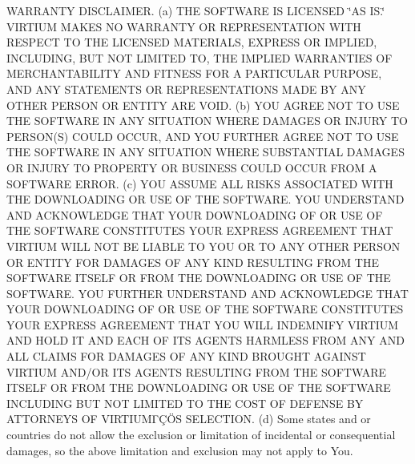 \begin{DoxyEnumerate}
\item W\+A\+R\+R\+A\+N\+TY D\+I\+S\+C\+L\+A\+I\+M\+ER. (a) T\+HE S\+O\+F\+T\+W\+A\+RE IS L\+I\+C\+E\+N\+S\+ED \char`\"{}\+A\+S I\+S.\char`\"{} V\+I\+R\+T\+I\+UM M\+A\+K\+ES NO W\+A\+R\+R\+A\+N\+TY OR R\+E\+P\+R\+E\+S\+E\+N\+T\+A\+T\+I\+ON W\+I\+TH R\+E\+S\+P\+E\+CT TO T\+HE L\+I\+C\+E\+N\+S\+ED M\+A\+T\+E\+R\+I\+A\+LS, E\+X\+P\+R\+E\+SS OR I\+M\+P\+L\+I\+ED, I\+N\+C\+L\+U\+D\+I\+NG, B\+UT N\+OT L\+I\+M\+I\+T\+ED TO, T\+HE I\+M\+P\+L\+I\+ED W\+A\+R\+R\+A\+N\+T\+I\+ES OF M\+E\+R\+C\+H\+A\+N\+T\+A\+B\+I\+L\+I\+TY A\+ND F\+I\+T\+N\+E\+SS F\+OR A P\+A\+R\+T\+I\+C\+U\+L\+AR P\+U\+R\+P\+O\+SE, A\+ND A\+NY S\+T\+A\+T\+E\+M\+E\+N\+TS OR R\+E\+P\+R\+E\+S\+E\+N\+T\+A\+T\+I\+O\+NS M\+A\+DE BY A\+NY O\+T\+H\+ER P\+E\+R\+S\+ON OR E\+N\+T\+I\+TY A\+RE V\+O\+ID. (b) Y\+OU A\+G\+R\+EE N\+OT TO U\+SE T\+HE S\+O\+F\+T\+W\+A\+RE IN A\+NY S\+I\+T\+U\+A\+T\+I\+ON W\+H\+E\+RE D\+A\+M\+A\+G\+ES OR I\+N\+J\+U\+RY TO P\+E\+R\+S\+O\+N(\+S) C\+O\+U\+LD O\+C\+C\+UR, A\+ND Y\+OU F\+U\+R\+T\+H\+ER A\+G\+R\+EE N\+OT TO U\+SE T\+HE S\+O\+F\+T\+W\+A\+RE IN A\+NY S\+I\+T\+U\+A\+T\+I\+ON W\+H\+E\+RE S\+U\+B\+S\+T\+A\+N\+T\+I\+AL D\+A\+M\+A\+G\+ES OR I\+N\+J\+U\+RY TO P\+R\+O\+P\+E\+R\+TY OR B\+U\+S\+I\+N\+E\+SS C\+O\+U\+LD O\+C\+C\+UR F\+R\+OM A S\+O\+F\+T\+W\+A\+RE E\+R\+R\+OR. (c) Y\+OU A\+S\+S\+U\+ME A\+LL R\+I\+S\+KS A\+S\+S\+O\+C\+I\+A\+T\+ED W\+I\+TH T\+HE D\+O\+W\+N\+L\+O\+A\+D\+I\+NG OR U\+SE OF T\+HE S\+O\+F\+T\+W\+A\+RE. Y\+OU U\+N\+D\+E\+R\+S\+T\+A\+ND A\+ND A\+C\+K\+N\+O\+W\+L\+E\+D\+GE T\+H\+AT Y\+O\+UR D\+O\+W\+N\+L\+O\+A\+D\+I\+NG OF OR U\+SE OF T\+HE S\+O\+F\+T\+W\+A\+RE C\+O\+N\+S\+T\+I\+T\+U\+T\+ES Y\+O\+UR E\+X\+P\+R\+E\+SS A\+G\+R\+E\+E\+M\+E\+NT T\+H\+AT V\+I\+R\+T\+I\+UM W\+I\+LL N\+OT BE L\+I\+A\+B\+LE TO Y\+OU OR TO A\+NY O\+T\+H\+ER P\+E\+R\+S\+ON OR E\+N\+T\+I\+TY F\+OR D\+A\+M\+A\+G\+ES OF A\+NY K\+I\+ND R\+E\+S\+U\+L\+T\+I\+NG F\+R\+OM T\+HE S\+O\+F\+T\+W\+A\+RE I\+T\+S\+E\+LF OR F\+R\+OM T\+HE D\+O\+W\+N\+L\+O\+A\+D\+I\+NG OR U\+SE OF T\+HE S\+O\+F\+T\+W\+A\+RE. Y\+OU F\+U\+R\+T\+H\+ER U\+N\+D\+E\+R\+S\+T\+A\+ND A\+ND A\+C\+K\+N\+O\+W\+L\+E\+D\+GE T\+H\+AT Y\+O\+UR D\+O\+W\+N\+L\+O\+A\+D\+I\+NG OF OR U\+SE OF T\+HE S\+O\+F\+T\+W\+A\+RE C\+O\+N\+S\+T\+I\+T\+U\+T\+ES Y\+O\+UR E\+X\+P\+R\+E\+SS A\+G\+R\+E\+E\+M\+E\+NT T\+H\+AT Y\+OU W\+I\+LL I\+N\+D\+E\+M\+N\+I\+FY V\+I\+R\+T\+I\+UM A\+ND H\+O\+LD IT A\+ND E\+A\+CH OF I\+TS A\+G\+E\+N\+TS H\+A\+R\+M\+L\+E\+SS F\+R\+OM A\+NY A\+ND A\+LL C\+L\+A\+I\+MS F\+OR D\+A\+M\+A\+G\+ES OF A\+NY K\+I\+ND B\+R\+O\+U\+G\+HT A\+G\+A\+I\+N\+ST V\+I\+R\+T\+I\+UM A\+N\+D/\+OR I\+TS A\+G\+E\+N\+TS R\+E\+S\+U\+L\+T\+I\+NG F\+R\+OM T\+HE S\+O\+F\+T\+W\+A\+RE I\+T\+S\+E\+LF OR F\+R\+OM T\+HE D\+O\+W\+N\+L\+O\+A\+D\+I\+NG OR U\+SE OF T\+HE S\+O\+F\+T\+W\+A\+RE I\+N\+C\+L\+U\+D\+I\+NG B\+UT N\+OT L\+I\+M\+I\+T\+ED TO T\+HE C\+O\+ST OF D\+E\+F\+E\+N\+SE BY A\+T\+T\+O\+R\+N\+E\+YS OF V\+I\+R\+T\+I\+U\+MΓÇÖS S\+E\+L\+E\+C\+T\+I\+ON. (d) Some states and or countries do not allow the exclusion or limitation of incidental or consequential damages, so the above limitation and exclusion may not apply to You.

\end{DoxyEnumerate}
